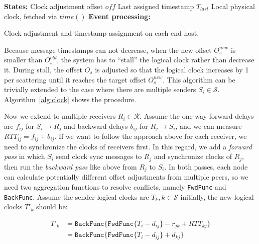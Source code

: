 \begin{algorithm}[t]
 \DontPrintSemicolon
 \textbf{States:} Clock adjustment offset $off$\;
 \qquad Last assigned timestamp $T_{last}$\;
 \qquad Local physical clock, fetched via $time()$\;
 \textbf{Event processing:}\;
 \caption{Clock adjustment and timestamp assignment on each end host.}
 \label{alg:clock}
\end{algorithm}


Because message timestamps can not decrease, when the new offset $O_s^{new}$ is smaller than $O_s^{old}$, the system has to ``stall'' the logical clock rather than decrease it.
During stall, the offset $O_s$ is adjusted so that the logical clock increases by 1 per scattering until it reaches the target offset $O_s^{new}$. 
This algorithm can be trivially extended to the case where there are multiple senders $S_i \in \mathcal{S}$.
Algorithm~\ref{alg:clock} shows the procedure.

Now we extend to multiple receivers $R_i \in \mathcal{R}$.
Assume the one-way forward delays are $f_{ij}$ for $S_i \rightarrow R_j$ and backward delays $b_{ij}$ for $R_j \rightarrow S_i$, and we can measure $RTT_{ij} = f_{ij} + b_{ij}$.
If we want to follow the approach above for each receiver, we need to synchronize the clocks of receivers first.
In this regard, we add a \textit{forward pass} in which $S_i$ send clock sync messages to $R_j$ and synchronize clocks of $R_j$, then run the \textit{backward pass} like above from $R_j$ to $S_i$.
In both passes, each node can calculate potentially different offset adjustments from multiple peers, so we need two aggregation functions to resolve conflicts, namely \texttt{FwdFunc} and \texttt{BackFunc}.
Assume the sender logical clocks are $T_k, k \in \mathcal{S}$ initially, the new logical clocks $T'_k$ should be:

\vspace{-1em}
\begin{equation*}
\begin{aligned}
T'_k & = \texttt{BackFunc} \{ \texttt{FwdFunc} \{ T_i - d_{ij} \} - r_{jk} + RTT_{kj} \} \\
     & = \texttt{BackFunc} \{ \texttt{FwdFunc} \{ T_i - d_{ij} \} + d_{kj} \}
\end{aligned}
\end{equation*}

